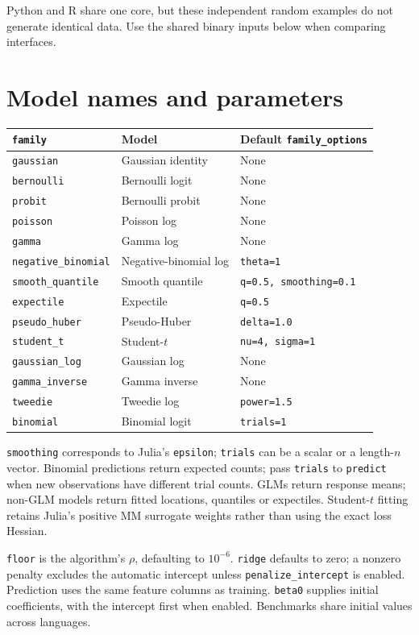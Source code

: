 \documentclass[10pt,a4paper]{article}
\begin{document}
Python and R share one core, but these independent random examples do not generate
identical data. Use the shared binary inputs below when comparing interfaces.

\section{Model names and parameters}
\begin{tabular}{lll}
\toprule
\texttt{family} & Model & Default \texttt{family\_options} \\
\midrule
\texttt{gaussian} & Gaussian identity & None \\
\texttt{bernoulli} & Bernoulli logit & None \\
\texttt{probit} & Bernoulli probit & None \\
\texttt{poisson} & Poisson log & None \\
\texttt{gamma} & Gamma log & None \\
\texttt{negative\_binomial} & Negative-binomial log & \texttt{theta=1} \\
\texttt{smooth\_quantile} & Smooth quantile & \texttt{q=0.5, smoothing=0.1} \\
\texttt{expectile} & Expectile & \texttt{q=0.5} \\
\texttt{pseudo\_huber} & Pseudo-Huber & \texttt{delta=1.0} \\
\texttt{student\_t} & Student-$t$ & \texttt{nu=4, sigma=1} \\
\texttt{gaussian\_log} & Gaussian log & None \\
\texttt{gamma\_inverse} & Gamma inverse & None \\
\texttt{tweedie} & Tweedie log & \texttt{power=1.5} \\
\texttt{binomial} & Binomial logit & \texttt{trials=1} \\
\bottomrule
\end{tabular}

\texttt{smoothing} corresponds to Julia's \texttt{epsilon}; \texttt{trials}
can be a scalar or a length-$n$ vector. Binomial predictions return expected counts;
pass \texttt{trials} to \texttt{predict} when new observations have different trial
counts. GLMs return response means; non-GLM models return fitted locations,
quantiles or expectiles. Student-$t$ fitting retains Julia's positive MM surrogate
weights rather than using the exact loss Hessian.

\texttt{floor} is the algorithm's $\rho$, defaulting to $10^{-6}$.
\texttt{ridge} defaults to zero; a nonzero penalty excludes the automatic intercept
unless \texttt{penalize\_intercept} is enabled. Prediction uses the same feature
columns as training. \texttt{beta0} supplies initial coefficients, with the
intercept first when enabled. Benchmarks share initial values across languages.
\end{document}
